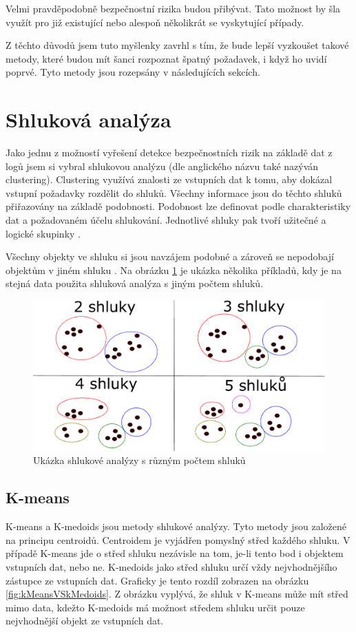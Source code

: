\documentclass[thesis=M,czech]{FITthesis}[2012/10/20]
\newcommand{\tmpframe}[1]{\fbox{#1}}
\renewcommand{\tmpframe}[1]{#1}
\begin{document}
		Velmi pravděpodobně bezpečnostní rizika budou přibývat. Tato možnost by šla využít pro již existující nebo alespoň několikrát se vyskytující případy.
		
		Z těchto důvodů jsem tuto myšlenky zavrhl s tím, že bude lepší vyzkoušet takové metody, které budou mít šanci rozpoznat špatný požadavek, i když ho uvidí poprvé. Tyto metody jsou rozepsány v následujících sekcích. 		
	
	\section{Shluková analýza}
		Jako jednu z možností vyřešení detekce bezpečnostních rizik na základě dat z logů jsem si vybral shlukovou analýzu (dle anglického názvu také nazýván clustering). Clustering využívá znalosti ze vstupních dat k tomu, aby dokázal vstupní požadavky rozdělit do shluků. Všechny informace jsou do těchto shluků přiřazovány na základě podobnosti. Podobnost lze definovat podle charakteristiky dat a požadovaném účelu shlukování. Jednotlivé shluky pak tvoří užitečné a logické skupinky .
		
		Všechny objekty ve shluku si jsou navzájem podobné a zároveň se nepodobají objektům v jiném shluku \cite{IntroductionToDataMining}. Na obrázku \ref{fig:clustering} je ukázka několika příkladů, kdy je na stejná data použita shluková analýza s jiným počtem shluků.
		
		\begin{figure}[htb]\centering
			\tmpframe{\includegraphics[width=\textwidth]{./img/shlukova_anal}}		
			\caption{Ukázka shlukové analýzy s různým počtem shluků}
			\label{fig:clustering}
		\end{figure}
		
		\subsection{K-means}
			K-means a K-medoids jsou metody shlukové analýzy. Tyto metody jsou založené na principu centroidů. Centroidem je vyjádřen pomyslný střed každého shluku. V případě K-means jde o střed shluku nezávisle na tom, je-li tento bod i objektem vstupních dat, nebo ne. K-medoids jako střed shluku určí vždy nejvhodnějšího zástupce ze vstupních dat. Graficky je tento rozdíl zobrazen na obrázku \ref{fig:kMeansVSkMedoids}. Z obrázku vyplývá, že shluk v K-means může mít střed mimo data, kdežto K-medoids má možnost středem shluku určit pouze nejvhodnější objekt ze vstupních dat.
			
\end{document}
